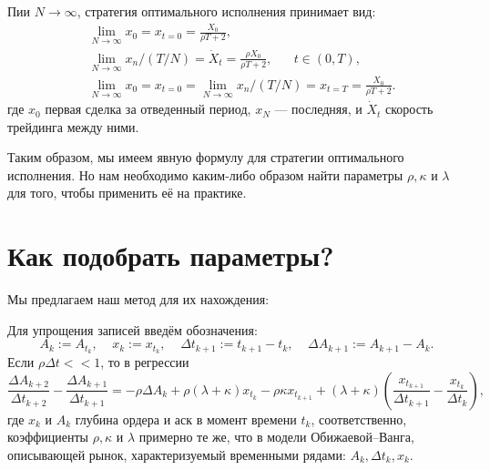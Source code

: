 \begin{theorem}
    Пии $N \rightarrow \infty$, стратегия оптимального исполнения принимает вид:
    \begin{align*}
        & \lim _{N \rightarrow \infty} x_0 = x_{t = 0} = \frac{X_0}{\rho T + 2}, \\
        & \lim _{N \rightarrow \infty} x_n / (T/N) = \dot X _t = \frac{\rho X_0}{\rho T + 2}, \;\;\;\;\;\; t \in (0, T), \\
        & \lim _{N \rightarrow \infty} x_0 = x_{t = 0} = \lim _{N \rightarrow \infty} x_n / (T/N) = x_{t=T}=  \frac{X_0}{\rho T + 2}.  %
    \end{align*}
    где $x_0$ первая сделка за отведенный период, $x_N$ --- последняя, и $\dot X _t$ скорость трейдинга между ними.
\end{theorem}

Таким образом, мы имеем явную формулу для стратегии оптимального исполнения. Но нам необходимо каким-либо образом найти
параметры $\rho, \kappa$ и $\lambda$ для того, чтобы применить её на практике. 

\section{Как подобрать параметры?}

Мы предлагаем наш метод для их нахождения: 
\begin{theorem}
    Для упрощения записей введём обозначения:
    \[
    A_k := A_{t_k}, \; \; \; \; 
    x_{k}:= x_{t_k}, \; \; \; \; 
    \Delta t_{k+1} := t_{k+1} - t_k, \; \; \; \;   
    \Delta A_{k+1} := A_{k+1} - A_k. 
    \]
        Если $\rho \Delta t << 1$, то в регрессии                                                                                                                                                                                                                                                                                                                                                                                     
        \begin{equation*}
            \frac{\Delta A_{k+2}}{\Delta t_{k+2}} - \frac{\Delta A_{k+1}}{\Delta t_{k+1}} 
        = -\rho \Delta A_k + \rho (\lambda + \kappa) x_{t_k} - \rho \kappa x_{t_{k+1}} 
        + (\lambda + \kappa) \left(\frac{x_{t_{k+1}}}{\Delta t_{k+1}} - \frac{x_{t_k}}{\Delta t_{k}}\right),
        \end{equation*}
        где $x_{k}$ и $A_{k}$ глубина ордера и аск в момент времени $t_k$, соответственно, \\

        коэффициенты $\rho, \kappa$ и $\lambda$ примерно те же, что в модели Обижаевой--Ванга, описывающей рынок,
        характеризуемый временными рядами: $A_k, \Delta t _k, x_k$.



\end{theorem}

